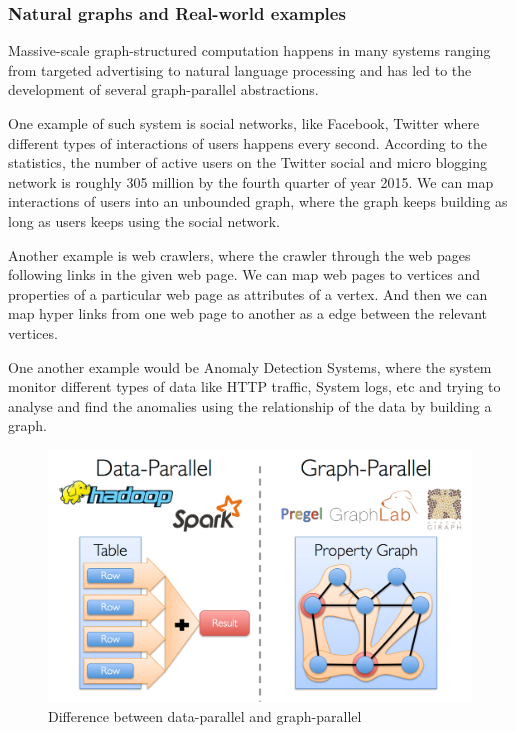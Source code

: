 \documentclass[12pt]{article}
\begin{document}
\subsubsection{Natural graphs and Real-world examples}

Massive-scale graph-structured computation happens in many systems ranging from targeted advertising to natural language processing and has led to the development of several graph-parallel abstractions. 

One example of such system is social networks, like Facebook, Twitter where different types of interactions of users happens every second. According to the statistics, the number of active users on the Twitter social and micro blogging network is roughly 305 million by the fourth quarter of  year 2015. We can map interactions of users into an unbounded graph, where the graph keeps building as long as users keeps using the social network.

Another example is web crawlers, where the crawler through the web pages following links in the given web page. We can map web pages to vertices and properties of a particular web page as attributes of a vertex. And then we can map hyper links from one web page to another as a edge between the relevant vertices.  

One another example would be Anomaly  Detection Systems, where the system monitor different types of data like HTTP traffic, System logs, etc and trying to analyse and find the anomalies using the relationship of the data by building a graph.

\begin{figure}
\centering
\includegraphics[width=\textwidth]{image00.png}
\caption{Difference between data-parallel and graph-parallel}
\label{fig:parallel}
\end{figure}
\end{document}
